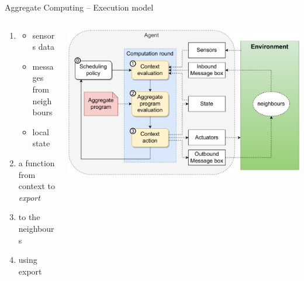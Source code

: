 \documentclass[9pt, aspectratio=169, handout]{beamer}
\begin{document}
\begin{frame}{Aggregate Computing -- Execution model}
  \begin{columns}
    \begin{column}{0.49\textwidth}
      \begin{card}
        \begin{enumerate}
          \item {}
          \begin{itemize}
            \item sensors data
            \item messages from neighbours
            \item local state
          \end{itemize}
          \item {} a function from context to \emph{export}
          \item {} to the neighbours
          \item {} using export
        \end{enumerate}
      \end{card}
    \end{column}
    \begin{column}{0.51\textwidth}  
      \begin{cardTiny}
        \includegraphics[width=\textwidth]{img/aggregate-agent-control-architecture.drawio.pdf}    
      \end{cardTiny}
    \end{column}
  \end{columns}
\end{frame}
\end{document}
